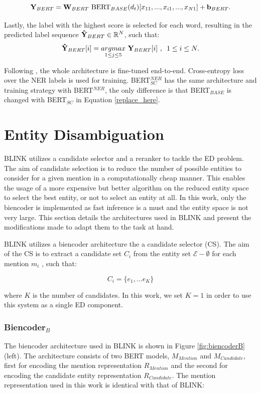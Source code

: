 \documentclass{report}
\theoremstyle{definition}
\theoremstyle{remark}
\begin{document}
\begin{equation}
\label{replace_here}
   \bold{Y}_{BERT} = \bold{W}_{BERT} \ \text{BERT}_{BASE}(d_t)[x_{11},...,x_{i1},...,x_{N1}] + \bold{b}_{BERT}.
\end{equation}

Lastly, the label with the highest score is selected for each word, resulting in the predicted label sequence $\bold{\Hat{Y}}_{BERT} \in \mathbb{R}^N$, such that:
\begin{equation}
    \bold{\Hat{Y}}_{BERT}[i] = \underset{1\leq j\leq5}{argmax} \ \bold{Y}_{BERT} [i] \ \text{, } \ 1\leq i \leq N. 
\end{equation}

Following \cite{BERT}, the whole architecture is fine-tuned end-to-end. Cross-entropy loss over the NER labels is used for training. BERT$^{NER}_{SC}$ has the same architecture and training strategy with BERT$^{NER}$, the only difference is that BERT$_{BASE}$ is changed with BERT$_{SC}$ in Equation \ref{replace_here}.

\section{Entity Disambiguation}
\label{sec:entdismethod}
BLINK utilizes a candidate selector and a reranker to tackle the ED problem. The aim of candidate selection is to reduce the number of possible entities to consider for a given mention in a computationally cheap manner. This enables the usage of a more expensive but better algorithm on the reduced entity space to select the best entity, or not to select an entity at all. In this work, only the biencoder is implemented as fast inference is a must and the entity space is not very large. This section details the architectures used in BLINK and present the modifications made to adapt them to the task at hand.

BLINK utilizes a biencoder architecture the a candidate selector (CS). The aim of the CS is to extract a candidate set $C_i$ from the entity set $\mathcal{E} - \emptyset$ for each mention $m_i$ , such that:

\begin{equation}
    C_i = \{e_1,...e_K\} 
\end{equation}

\noindent where $K$ is the number of candidates. In this work, we set $K=1$ in order to use this system as a single ED component.

\subsubsection{Biencoder$_{B}$}
\label{sec:biencoderbexplanation}
The biencoder architecture used in BLINK is shown in Figure \ref{fig:biencoderB} (left). The architecture consists of two BERT models, $M_{Mention}$ and $M_{Candidate}$, first for encoding the mention representation $R_{Mention}$ and the second for encoding the candidate entity representation $R_{Candidate}$. The mention representation used in this work is identical with that of BLINK:
\end{document}

